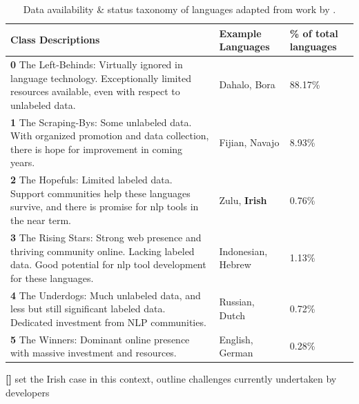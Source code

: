 \documentclass[thesis]{cluu}
\newcounter{paranum}
\newcommand{\numberedparagraph}{\par\refstepcounter{paranum}\textbf{[\theparanum] }}
\begin{document}
\begin{table}[h]
    \centering
    \begin{tabularx}{\textwidth}{|X|p{2cm}|p{1.75cm}|}
        \hline
        \textbf{Class Descriptions} & \textbf{Example Languages} & \textbf{\% of total languages}\\ \hline
        \textbf{0} The Left-Behinds: Virtually ignored in language technology. Exceptionally limited resources available, even with respect to unlabeled data. & Dahalo, Bora & 88.17\%\\ \hline
        \textbf{1} The Scraping-Bys: Some unlabeled data. With organized promotion and data collection, there is hope for improvement in coming years. & Fijian, Navajo & 8.93\%\\ \hline
        \textbf{2} The Hopefuls: Limited labeled data. Support communities help these languages survive, and there is promise for \gls{nlp} tools in the near term. & Zulu, \textbf{Irish} & 0.76\%\\ \hline
        \textbf{3} The Rising Stars: Strong web presence and thriving community online. Lacking labeled data. Good potential for \gls{nlp} tool development for these languages. & Indonesian, Hebrew & 1.13\%\\ \hline
        \textbf{4} The Underdogs: Much unlabeled data, and less but still significant labeled data. Dedicated investment from NLP communities. & Russian, Dutch & 0.72\%\\ \hline
        \textbf{5} The Winners: Dominant online presence with massive investment and resources. & English, German & 0.28\%\\ \hline
    \end{tabularx}
    \caption{Data availability \& status taxonomy of languages adapted from work by \textcite{joshiStateFateLinguistic2021}.}
    \label{tab:data_availability}
\end{table}
\numberedparagraph{set the Irish case in this context, outline challenges currently undertaken by developers}
\end{document}
